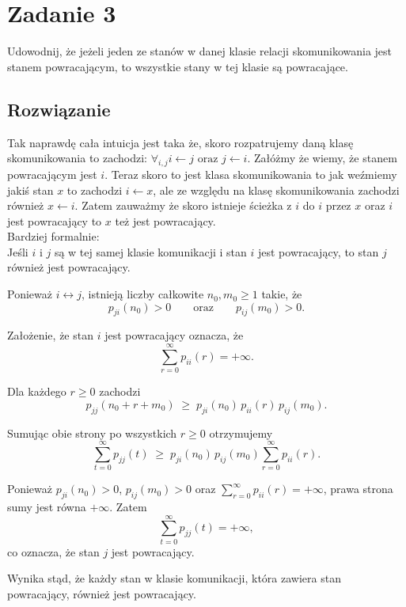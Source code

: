 \section{Zadanie 3}
Udowodnij, że jeżeli jeden ze stanów w danej klasie relacji skomunikowania
jest stanem powracającym, to wszystkie stany w tej klasie są powracające.
\subsection*{Rozwiązanie}
Tak naprawdę cała intuicja jest taka że, skoro rozpatrujemy daną klasę skomunikowania to zachodzi: \(\forall_{i,j} i\leftarrow j \text{ oraz } j\leftarrow i\). Załóżmy że wiemy, że stanem powracającym jest \(i\). Teraz skoro to jest klasa skomunikowania to jak weźmiemy jakiś stan \(x\) to zachodzi \(i\leftarrow x\), ale ze względu na klasę skomunikowania zachodzi również \(x\leftarrow i\). Zatem zauważmy że skoro istnieje ścieżka z \(i\) do \(i\) przez \(x\) oraz \(i\) jest powracający to \(x\) też jest powracający.\\
Bardziej formalnie:\\

Jeśli \(i\) i \(j\) są w tej samej klasie komunikacji i stan \(i\) jest powracający,
to stan \(j\) również jest powracający.
\par
Ponieważ \(i \leftrightarrow j\), istnieją liczby całkowite \(n_0,m_0 \ge 1\)
takie, że
\[
	p_{j i}(n_0) > 0
	\qquad\text{oraz}\qquad
	p_{i j}(m_0) > 0 .
\]

Założenie, że stan \(i\) jest powracający oznacza, że
\[
	\sum_{r=0}^{\infty} p_{ii}(r) = +\infty.
\]

Dla każdego \(r \ge 0\) zachodzi
\[
	p_{j j}(n_0 + r + m_0)
	\;\ge\;
	p_{j i}(n_0) \, p_{i i}(r) \, p_{i j}(m_0).
\]

Sumując obie strony po wszystkich \(r \ge 0\) otrzymujemy
\[
	\sum_{t = 0}^{\infty} p_{j j}(t)
	\;\ge\;
	p_{j i}(n_0) \, p_{i j}(m_0)
	\sum_{r = 0}^{\infty} p_{i i}(r).
\]

Ponieważ \(p_{ji}(n_0) > 0\), \(p_{ij}(m_0) > 0\) oraz
\(\sum_{r=0}^{\infty} p_{ii}(r) = +\infty\), prawa strona sumy jest równa
\(+\infty\). Zatem
\[
	\sum_{t=0}^{\infty} p_{jj}(t) = +\infty,
\]
co oznacza, że stan \(j\) jest powracający.

Wynika stąd, że każdy stan w klasie komunikacji, która zawiera stan powracający,
również jest powracający.
